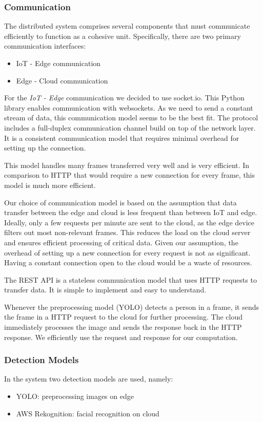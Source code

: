\documentclass[conference]{IEEEtran}
\begin{document}
\subsubsection{Communication}
The distributed system comprises several components that must communicate efficiently to function as a cohesive unit. Specifically, there are two primary communication interfaces:
\\
\begin{itemize}
    \item IoT - Edge communication
    \item Edge - Cloud communication
\end{itemize}

\hfill \break
For the \textit{IoT - Edge} communication we decided to use socket.io. This Python library enables communication with websockets. As we need to send a constant stream of data, this communication model seems to be the best fit. The protocol includes a full-duplex communication channel build on top of the network layer. It is a consistent communication model that requires minimal overhead for setting up the connection. 

This model handles many frames transferred very well and is very efficient. In comparison to HTTP that would require a new connection for every frame, this model is much more efficient. 


Our choice of communication model is based on the assumption that data transfer between the edge and cloud is less frequent than between IoT and edge. Ideally, only a few requests per minute are sent to the cloud, as the edge device filters out most non-relevant frames. This reduces the load on the cloud server and ensures efficient processing of critical data.
Given our assumption, the overhead of setting up a new connection for every request is not as significant. Having a constant connection open to the cloud would be a waste of resources. 

The REST API is a stateless communication model that uses HTTP requests to transfer data. It is simple to implement and easy to understand. 

Whenever the preprocessing model (YOLO) detects a person in a frame, it sends the frame in a HTTP request to the cloud for further processing. The cloud immediately processes the image and sends the response back in the HTTP response. We efficiently use the request and response for our computation. 


\subsubsection{Detection Models}
In the system two detection models are used, namely: 
\begin{itemize}
\item YOLO: preprocessing images on edge
\item AWS Rekognition: facial recognition on cloud
\end{itemize}
\end{document}
